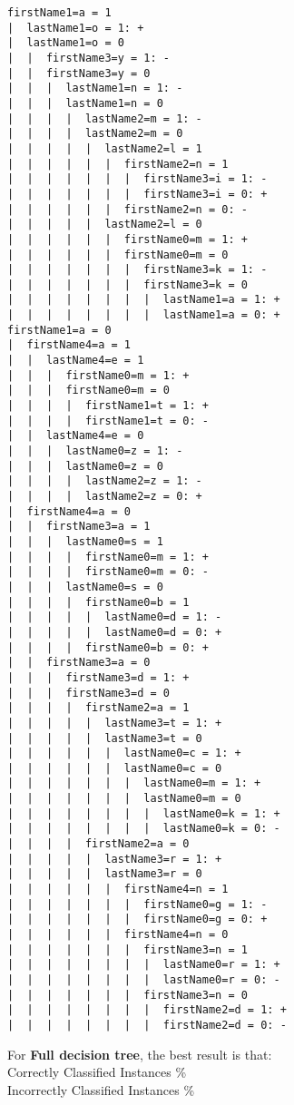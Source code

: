 \begin{enumerate}
\begin{enumerate}
\begin{lstlisting}
firstName1=a = 1
|  lastName1=o = 1: +
|  lastName1=o = 0
|  |  firstName3=y = 1: -
|  |  firstName3=y = 0
|  |  |  lastName1=n = 1: -
|  |  |  lastName1=n = 0
|  |  |  |  lastName2=m = 1: -
|  |  |  |  lastName2=m = 0
|  |  |  |  |  lastName2=l = 1
|  |  |  |  |  |  firstName2=n = 1
|  |  |  |  |  |  |  firstName3=i = 1: -
|  |  |  |  |  |  |  firstName3=i = 0: +
|  |  |  |  |  |  firstName2=n = 0: -
|  |  |  |  |  lastName2=l = 0
|  |  |  |  |  |  firstName0=m = 1: +
|  |  |  |  |  |  firstName0=m = 0
|  |  |  |  |  |  |  firstName3=k = 1: -
|  |  |  |  |  |  |  firstName3=k = 0
|  |  |  |  |  |  |  |  lastName1=a = 1: +
|  |  |  |  |  |  |  |  lastName1=a = 0: +
firstName1=a = 0
|  firstName4=a = 1
|  |  lastName4=e = 1
|  |  |  firstName0=m = 1: +
|  |  |  firstName0=m = 0
|  |  |  |  firstName1=t = 1: +
|  |  |  |  firstName1=t = 0: -
|  |  lastName4=e = 0
|  |  |  lastName0=z = 1: -
|  |  |  lastName0=z = 0
|  |  |  |  lastName2=z = 1: -
|  |  |  |  lastName2=z = 0: +
|  firstName4=a = 0
|  |  firstName3=a = 1
|  |  |  lastName0=s = 1
|  |  |  |  firstName0=m = 1: +
|  |  |  |  firstName0=m = 0: -
|  |  |  lastName0=s = 0
|  |  |  |  firstName0=b = 1
|  |  |  |  |  lastName0=d = 1: -
|  |  |  |  |  lastName0=d = 0: +
|  |  |  |  firstName0=b = 0: +
|  |  firstName3=a = 0
|  |  |  firstName3=d = 1: +
|  |  |  firstName3=d = 0
|  |  |  |  firstName2=a = 1
|  |  |  |  |  lastName3=t = 1: +
|  |  |  |  |  lastName3=t = 0
|  |  |  |  |  |  lastName0=c = 1: +
|  |  |  |  |  |  lastName0=c = 0
|  |  |  |  |  |  |  lastName0=m = 1: +
|  |  |  |  |  |  |  lastName0=m = 0
|  |  |  |  |  |  |  |  lastName0=k = 1: +
|  |  |  |  |  |  |  |  lastName0=k = 0: -
|  |  |  |  firstName2=a = 0
|  |  |  |  |  lastName3=r = 1: +
|  |  |  |  |  lastName3=r = 0
|  |  |  |  |  |  firstName4=n = 1
|  |  |  |  |  |  |  firstName0=g = 1: -
|  |  |  |  |  |  |  firstName0=g = 0: +
|  |  |  |  |  |  firstName4=n = 0
|  |  |  |  |  |  |  firstName3=n = 1
|  |  |  |  |  |  |  |  lastName0=r = 1: +
|  |  |  |  |  |  |  |  lastName0=r = 0: -
|  |  |  |  |  |  |  firstName3=n = 0
|  |  |  |  |  |  |  |  firstName2=d = 1: +
|  |  |  |  |  |  |  |  firstName2=d = 0: -

\end{lstlisting}


For {\bf Full decision tree}, the best result is that:\\
Correctly Classified Instances             \% \\
Incorrectly Classified Instances            \% \\


\end{enumerate}
\end{enumerate}
